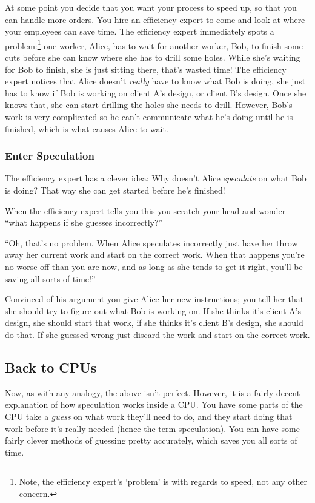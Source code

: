 \documentclass{article}
\begin{document}
At some point you decide that you want your process to speed up, so that you
can handle more orders. You hire an efficiency expert to come and look at
where your employees can save time. The efficiency expert immediately spots a
problem:\footnote{Note, the efficiency expert's `problem' is with regards to
speed, not any other concern.} one worker, Alice, has to wait for another
worker, Bob, to finish some cuts before she can know where she has to drill
some holes. While she's waiting for Bob to finish, she is just sitting there,
that's wasted time!  The efficiency expert notices that Alice doesn't
\emph{really} have to know what Bob is doing, she just has to know if Bob is
working on client A's design, or client B's design. Once she knows that, she
can start drilling the holes she needs to drill. However, Bob's work is very
complicated so he can't communicate what he's doing until he is finished,
which is what causes Alice to wait.

\subsubsection*{Enter Speculation}

The efficiency expert has a clever idea: Why doesn't Alice \emph{speculate}
on what Bob is doing? That way she can get started before he's finished!

When the efficiency expert tells you this you scratch your head and wonder
``what happens if she guesses incorrectly?''

``Oh, that's no problem. When Alice speculates incorrectly just have her throw
away her current work and start on the correct work. When that happens you're
no worse off than you are now, and as long as she tends to get it right, you'll
be saving all sorts of time!''

Convinced of his argument you give Alice her new instructions; you tell her
that she should try to figure out what Bob is working on. If she thinks it's
client A's design, she should start that work, if she thinks it's client B's
design, she should do that. If she guessed wrong just discard the work and
start on the correct work.


\subsection*{Back to CPUs}

Now, as with any analogy, the above isn't perfect. However, it is a fairly
decent explanation of how speculation works inside a CPU. You have some parts
of the CPU take a \emph{guess} on what work they'll need to do, and they start
doing that work before it's really needed (hence the term speculation). You can
have some fairly clever methods of guessing pretty accurately, which saves you
all sorts of time.
\end{document}
